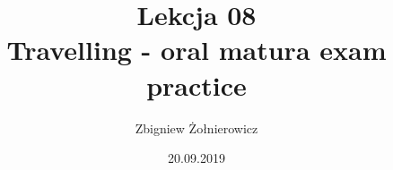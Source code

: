 \documentclass[a4paper]{article}
\begin{document}
\title{{\huge Lekcja 08} \\
{\large Travelling - oral matura exam practice}}
\author{Zbigniew Żołnierowicz}
\date{20.09.2019}
\maketitle
\end{document}
